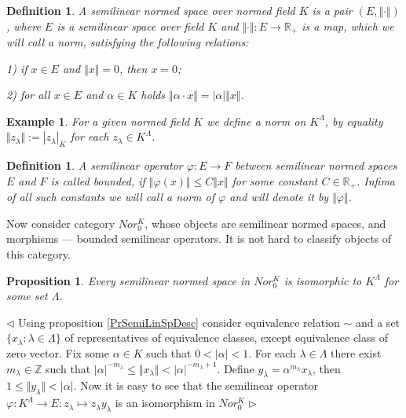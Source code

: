 \documentclass[12pt]{article}
\newtheorem{proposition}[theorem]{Proposition}
\newtheorem{definition}[theorem]{Definition}
\newtheorem{example}[theorem]{Example}
\newenvironment{proof}{\par $\triangleleft$}{$\triangleright$}
\begin{document}
\begin{definition}\label{DefSemiLinNorSp} A semilinear normed space over normed field $K$ is a pair $(E, \Vert \cdot \Vert)$, where $E$ is a semilinear space over field $K$ and $ \Vert \cdot \Vert : E \to \mathbb{R}_+$ is a map, which we will call a norm, satisfying the following relations:

1) if $x\in E$ and $\Vert x \Vert = 0$, then $x = 0$;

2) for all $x\in E$ and $\alpha\in K$ holds $\Vert \alpha \cdot x \Vert = | \alpha| \Vert x \Vert$.
\end{definition}

\begin{example}\label{ExSemiLinNorModelSp}
For a given normed field $K$ we define a norm on $K^{\Lambda}$, by equality $\Vert z_\lambda\Vert:=|z_\lambda|_K$ for each $z_\lambda\in K^\Lambda$. 
\end{example}

\begin{definition}\label{DefSemiLinBndOp} A semilinear operator $\varphi : E \to F$ between semilinear normed spaces $E$ and $F$ is called bounded, if $\Vert \varphi (x)\Vert \leq C \Vert x \Vert$ for  some constant $C\in\mathbb{R}_+$. Infima of all such constants we will call a norm of $\varphi$ and will denote it by $\Vert\varphi\Vert$.
\end{definition}

Now consider category $Nor_0^K$, whose objects are semilinear normed spaces, and morphisms --- bounded semilinear operators. It is not hard to classify objects of this category.

\begin{proposition}\label{PrSemiLinNorSpDesc} Every semilinear normed space in $Nor_0^K$ is isomorphic to $K^{\Lambda}$ for some set $\Lambda$.
\end{proposition}

\begin{proof} Using proposition \ref{PrSemiLinSpDesc} consider equivalence relation $\sim$ and a set $\{x_\lambda:\lambda\in\Lambda\}$ of representatives of equivalence classes, except equivalence class of zero vector. Fix some $\alpha\in K$ such that $0<|\alpha|<1$. For each $\lambda\in\Lambda$ there exist $m_\lambda\in\mathbb{Z}$ such that $|\alpha|^{-m_\lambda}\leq\Vert x_\lambda\Vert< |\alpha|^{-m_\lambda+1}$. Define $y_\lambda=\alpha^{m_\lambda} x_\lambda$, then $1\leq \Vert y_\lambda\Vert<|\alpha|$. Now it is easy to see that the semilinear operator $\varphi: K^\Lambda\to E: z_\lambda\mapsto z_\lambda y_\lambda$ is an isomorphism in $Nor_0^K$
\end{proof}
\end{document}
